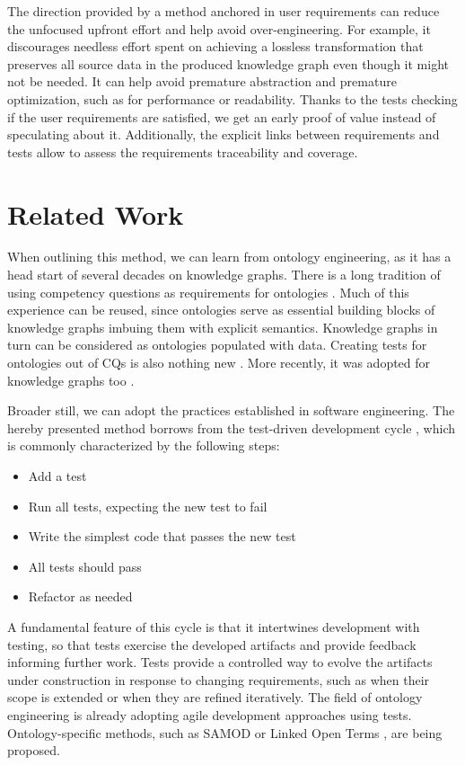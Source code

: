 \documentclass[
]{ceurart}
\begin{document}
The direction provided by a method anchored in user requirements can reduce the unfocused upfront effort and help avoid over-engineering. For example, it discourages needless effort spent on achieving a lossless transformation that preserves all source data in the produced knowledge graph even though it might not be needed. It can help avoid premature abstraction and premature optimization, such as for performance or readability. Thanks to the tests checking if the user requirements are satisfied, we get an early proof of value instead of speculating about it. Additionally, the explicit links between requirements and tests allow to assess the requirements traceability and coverage.

\section{Related Work}
When outlining this method, we can learn from ontology engineering, as it has a head start of several decades on knowledge graphs. There is a long tradition of using competency questions as requirements for ontologies \cite{Gruninger1994}. Much of this experience can be reused, since ontologies serve as essential building blocks of knowledge graphs imbuing them with explicit semantics. Knowledge graphs in turn can be considered as ontologies populated with data. Creating tests for ontologies out of CQs is also nothing new \cite{Ren2014,Zemmouchi2013}. More recently, it was adopted for knowledge graphs too \cite{Pan2017}.

Broader still, we can adopt the practices established in software engineering. The hereby presented method borrows from the test-driven development cycle \cite{Beck2003}, which is commonly characterized by the following steps:
\begin{itemize}
    \item Add a test
    \item Run all tests, expecting the new test to fail
    \item Write the simplest code that passes the new test
    \item All tests should pass
    \item Refactor as needed
\end{itemize}

A fundamental feature of this cycle is that it intertwines development with testing, so that tests exercise the developed artifacts and provide feedback informing further work. Tests provide a controlled way to evolve the artifacts under construction in response to changing requirements, such as when their scope is extended or when they are refined iteratively. The field of ontology engineering is already adopting agile development approaches using tests. Ontology-specific methods, such as SAMOD \cite{Peroni2016} or Linked Open Terms \cite{PovedaVillalon2022}, are being proposed.
\end{document}
